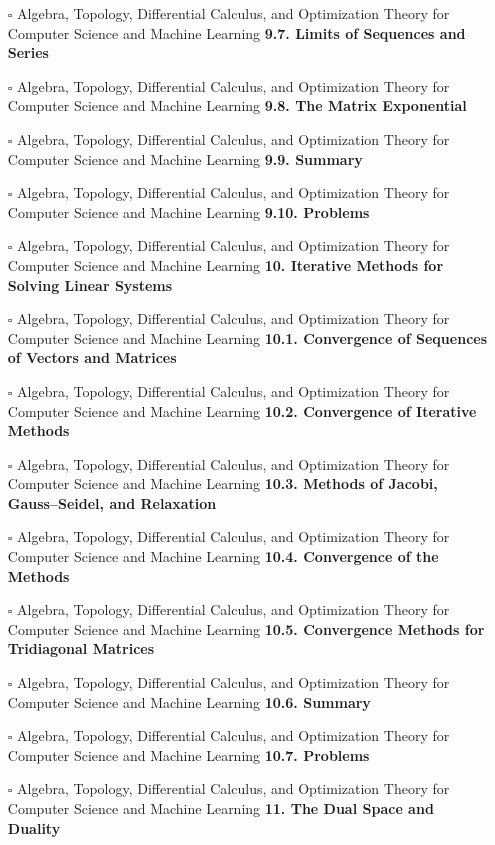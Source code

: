 \documentclass[a4, landscape, 12pt]{article}
\newcommand{\checkbox}{$\square$}%
\begin{document}
\begin{itemize}
{}
\item [\checkbox]  Algebra, Topology, Differential Calculus, and Optimization Theory for Computer Science and Machine Learning \textbf{ 9.7. Limits of Sequences and Series
}
\item [\checkbox]  Algebra, Topology, Differential Calculus, and Optimization Theory for Computer Science and Machine Learning \textbf{ 9.8. The Matrix Exponential
}
\item [\checkbox]  Algebra, Topology, Differential Calculus, and Optimization Theory for Computer Science and Machine Learning \textbf{ 9.9. Summary
}
\item [\checkbox]  Algebra, Topology, Differential Calculus, and Optimization Theory for Computer Science and Machine Learning \textbf{ 9.10. Problems
}
\item [\checkbox]  Algebra, Topology, Differential Calculus, and Optimization Theory for Computer Science and Machine Learning \textbf{ 10. Iterative Methods for Solving Linear Systems
}
\item [\checkbox]  Algebra, Topology, Differential Calculus, and Optimization Theory for Computer Science and Machine Learning \textbf{ 10.1. Convergence of Sequences of Vectors and Matrices
}
\item [\checkbox]  Algebra, Topology, Differential Calculus, and Optimization Theory for Computer Science and Machine Learning \textbf{ 10.2. Convergence of Iterative Methods
}
\item [\checkbox]  Algebra, Topology, Differential Calculus, and Optimization Theory for Computer Science and Machine Learning \textbf{ 10.3. Methods of Jacobi, Gauss–Seidel, and Relaxation
}
\item [\checkbox]  Algebra, Topology, Differential Calculus, and Optimization Theory for Computer Science and Machine Learning \textbf{ 10.4. Convergence of the Methods
}
\item [\checkbox]  Algebra, Topology, Differential Calculus, and Optimization Theory for Computer Science and Machine Learning \textbf{ 10.5. Convergence Methods for Tridiagonal Matrices
}
\item [\checkbox]  Algebra, Topology, Differential Calculus, and Optimization Theory for Computer Science and Machine Learning \textbf{ 10.6. Summary
}
\item [\checkbox]  Algebra, Topology, Differential Calculus, and Optimization Theory for Computer Science and Machine Learning \textbf{ 10.7. Problems
}
\item [\checkbox]  Algebra, Topology, Differential Calculus, and Optimization Theory for Computer Science and Machine Learning \textbf{ 11. The Dual Space and Duality
}
\end{itemize}
\end{document}
